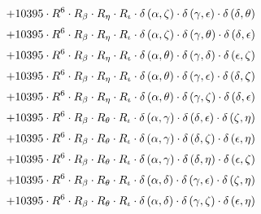 \begin{subequations}
\begin{gather}
 \\[0.2em] \notag 		 + 10395 \cdot R^{6} \cdot R_{\beta{}} \cdot R_{\eta{}} \cdot R_{\iota{}} \cdot \delta{}\left(\alpha{}, \zeta{}\right) \cdot \delta{}\left(\gamma{}, \epsilon{}\right) \cdot \delta{}\left(\delta{}, \theta{}\right) 
 \\[0.2em] \notag 		 + 10395 \cdot R^{6} \cdot R_{\beta{}} \cdot R_{\eta{}} \cdot R_{\iota{}} \cdot \delta{}\left(\alpha{}, \zeta{}\right) \cdot \delta{}\left(\gamma{}, \theta{}\right) \cdot \delta{}\left(\delta{}, \epsilon{}\right) 
 \\[0.2em] \notag 		 + 10395 \cdot R^{6} \cdot R_{\beta{}} \cdot R_{\eta{}} \cdot R_{\iota{}} \cdot \delta{}\left(\alpha{}, \theta{}\right) \cdot \delta{}\left(\gamma{}, \delta{}\right) \cdot \delta{}\left(\epsilon{}, \zeta{}\right) 
 \\[0.2em] \notag 		 + 10395 \cdot R^{6} \cdot R_{\beta{}} \cdot R_{\eta{}} \cdot R_{\iota{}} \cdot \delta{}\left(\alpha{}, \theta{}\right) \cdot \delta{}\left(\gamma{}, \epsilon{}\right) \cdot \delta{}\left(\delta{}, \zeta{}\right) 
 \\[0.2em] \notag 		 + 10395 \cdot R^{6} \cdot R_{\beta{}} \cdot R_{\eta{}} \cdot R_{\iota{}} \cdot \delta{}\left(\alpha{}, \theta{}\right) \cdot \delta{}\left(\gamma{}, \zeta{}\right) \cdot \delta{}\left(\delta{}, \epsilon{}\right) 
 \\[0.2em] \notag 		 + 10395 \cdot R^{6} \cdot R_{\beta{}} \cdot R_{\theta{}} \cdot R_{\iota{}} \cdot \delta{}\left(\alpha{}, \gamma{}\right) \cdot \delta{}\left(\delta{}, \epsilon{}\right) \cdot \delta{}\left(\zeta{}, \eta{}\right) 
 \\[0.2em] \notag 		 + 10395 \cdot R^{6} \cdot R_{\beta{}} \cdot R_{\theta{}} \cdot R_{\iota{}} \cdot \delta{}\left(\alpha{}, \gamma{}\right) \cdot \delta{}\left(\delta{}, \zeta{}\right) \cdot \delta{}\left(\epsilon{}, \eta{}\right) 
 \\[0.2em] \notag 		 + 10395 \cdot R^{6} \cdot R_{\beta{}} \cdot R_{\theta{}} \cdot R_{\iota{}} \cdot \delta{}\left(\alpha{}, \gamma{}\right) \cdot \delta{}\left(\delta{}, \eta{}\right) \cdot \delta{}\left(\epsilon{}, \zeta{}\right) 
 \\[0.2em] \notag 		 + 10395 \cdot R^{6} \cdot R_{\beta{}} \cdot R_{\theta{}} \cdot R_{\iota{}} \cdot \delta{}\left(\alpha{}, \delta{}\right) \cdot \delta{}\left(\gamma{}, \epsilon{}\right) \cdot \delta{}\left(\zeta{}, \eta{}\right) 
 \\[0.2em] \notag 		 + 10395 \cdot R^{6} \cdot R_{\beta{}} \cdot R_{\theta{}} \cdot R_{\iota{}} \cdot \delta{}\left(\alpha{}, \delta{}\right) \cdot \delta{}\left(\gamma{}, \zeta{}\right) \cdot \delta{}\left(\epsilon{}, \eta{}\right) 

\end{gather}
\end{subequations}
